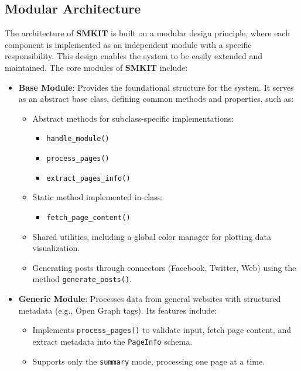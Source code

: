 \subsection{Modular Architecture}
\label{subsec:modular_architecture}
The architecture of \textbf{SMKIT} is built on a modular design principle, where each component is implemented as an independent module with a specific responsibility. This design enables the system to be easily extended and maintained. The core modules of \textbf{SMKIT} include:

\begin{itemize}
    \item \textbf{Base Module}: Provides the foundational structure for the system. It serves as an abstract base class, defining common methods and properties, such as:
        \begin{itemize}
            \item Abstract methods for subclass-specific implementations:
                \begin{itemize}
                    \item \texttt{handle\_module()}
                    \item \texttt{process\_pages()}
                    \item \texttt{extract\_pages\_info()}
                \end{itemize}
            \item Static method implemented in-class:
                \begin{itemize}
                    \item \texttt{fetch\_page\_content()}
                \end{itemize}
            \item Shared utilities, including a global color manager for plotting data visualization.
            \item Generating posts through connectors (Facebook, Twitter, Web) using the method \texttt{generate\_posts()}.
        \end{itemize}

    \item \textbf{Generic Module}: Processes data from general websites with structured metadata (e.g., Open Graph tags). Its features include:
        \begin{itemize}
            \item Implements \texttt{process\_pages()} to validate input, fetch page content, and extract metadata into the \texttt{PageInfo} schema.
            \item Supports only the \texttt{summary} mode, processing one page at a time.
        \end{itemize}


\end{itemize}
